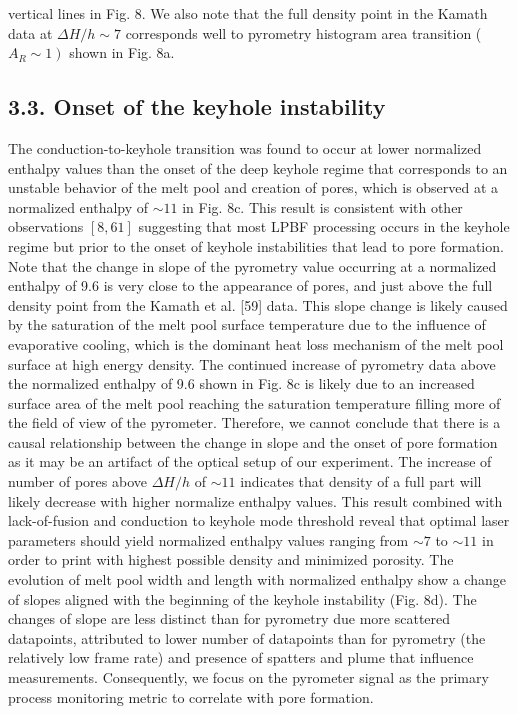 \documentclass[10pt]{article}
\begin{document}
vertical lines in Fig. 8. We also note that the full density point in the Kamath data at $\Delta H / h \sim 7$ corresponds well to pyrometry histogram area transition ( $\left.A_{R} \sim 1\right)$ shown in Fig. 8a.

\subsection*{3.3. Onset of the keyhole instability}
The conduction-to-keyhole transition was found to occur at lower normalized enthalpy values than the onset of the deep keyhole regime that corresponds to an unstable behavior of the melt pool and creation of pores, which is observed at a normalized enthalpy of $\sim 11$ in Fig. 8c. This result is consistent with other observations $[8,61]$ suggesting that most LPBF processing occurs in the keyhole regime but prior to the onset of keyhole instabilities that lead to pore formation. Note that the change in slope of the pyrometry value occurring at a normalized enthalpy of 9.6 is very close to the appearance of pores, and just above the full density point from the Kamath et al. [59] data. This slope change is likely caused by the saturation of the melt pool surface temperature due to the influence of evaporative cooling, which is the dominant heat loss mechanism of the melt pool surface at high energy density. The continued increase of pyrometry data above the normalized enthalpy of 9.6 shown in Fig. 8c is likely due to an increased surface area of the melt pool reaching the saturation temperature filling more of the field of view of the pyrometer. Therefore, we cannot conclude that there is a causal relationship between the change in slope and the onset of pore formation as it may be an artifact of the optical setup of our experiment. The increase of number of pores above $\Delta H / h$ of $\sim 11$ indicates that density of a full part will likely decrease with higher normalize enthalpy values. This result combined with lack-of-fusion and conduction to keyhole mode threshold reveal that optimal laser parameters should yield normalized enthalpy values ranging from $\sim 7$ to $\sim 11$ in order to print with highest possible density and minimized porosity. The evolution of melt pool width and length with normalized enthalpy show a change of slopes aligned with the beginning of the keyhole instability (Fig. 8d). The changes of slope are less distinct than for pyrometry due more scattered datapoints, attributed to lower number of datapoints than for pyrometry (the relatively low frame rate) and presence of spatters and plume that influence measurements. Consequently, we focus on the pyrometer signal as the primary process monitoring metric to correlate with pore formation.
\end{document}
